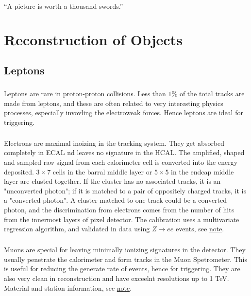\begin{savequote}[75mm]
“A picture is worth a thousand swords.”
\end{savequote}

\chapter{Reconstruction of Objects}

\section{Leptons}
\paragraph{}
Leptons are rare in proton-proton collisions. Less than $1\%$ of the total tracks are made from leptons, and these are often related to very interesting physics processes, especially invovling the electroweak forces. Hence leptons are ideal for triggering.

\paragraph{}
Electrons are maximal inoizing in the tracking system. They get absorbed completely in ECAL nd leaves no signature in the HCAL. The amplified, shaped and sampled raw signal from each calorimeter cell is converted into the energy deposited. $3\times 7$ cells in the barral middle layer or $ 5 \times 5$ in the endcap middle layer are clusted together. If the cluster has no associated tracks, it is an "unconverted photon"; if it is matched to a pair of oppositely charged tracks, it is a "converted photon". A cluster matched to one track could be a converted photon, and the discrimination from electrons comes from the number of hits from the innermost layers of pixel detector. The calibration uses a multivariate regression algorithm, and validated in data using $Z \to ee$ events, see \href{https://atlas.web.cern.ch/Atlas/GROUPS/PHYSICS/PUBNOTES/ATL-PHYS-PUB-2016-015/}{note}.

\paragraph{}
Muons are special for leaving minimally ionizing signatures in the detector. They usually penetrate the calorimeter and form tracks in the Muon Spetrometer. This is useful for reducing the generate rate of events, hence for triggering. They are also very clean in reconstruction and have exceelnt resolutions up to 1 TeV. Material and station information, see \href{https://cds.cern.ch/record/2252613/files/ATL-COM-MUON-2017-005.pdf}{note}.

